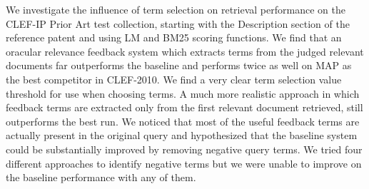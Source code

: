 We investigate the influence of term selection on retrieval performance on the CLEF-IP Prior Art test collection, starting with the Description section of the reference patent and using LM and BM25 scoring functions. We find that an oracular relevance feedback system which extracts terms from the judged relevant documents far outperforms the baseline and  performs twice as well on MAP as the best competitor in CLEF-2010.  We find a very clear term selection value threshold for use when choosing terms.  A much more realistic approach in which feedback terms are extracted only from the first relevant document retrieved, still outperforms the best run. We noticed that most of the useful feedback terms are actually present in the original query and hypothesized that the baseline system could be substantially improved by removing negative query terms.  We tried four different approaches to identify negative terms but we were unable to improve on the baseline performance with any of them.

% 